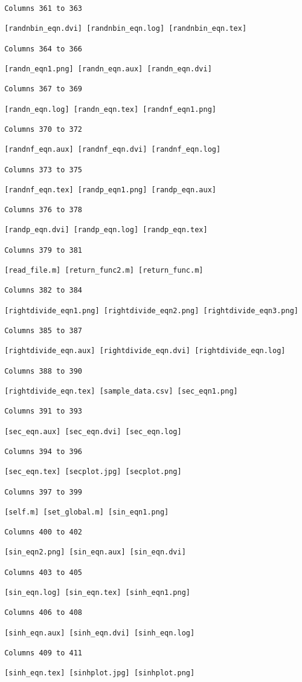 \begin{verbatim}
 Columns 361 to 363

 [randnbin_eqn.dvi] [randnbin_eqn.log] [randnbin_eqn.tex] 

 Columns 364 to 366

 [randn_eqn1.png] [randn_eqn.aux] [randn_eqn.dvi] 

 Columns 367 to 369

 [randn_eqn.log] [randn_eqn.tex] [randnf_eqn1.png] 

 Columns 370 to 372

 [randnf_eqn.aux] [randnf_eqn.dvi] [randnf_eqn.log] 

 Columns 373 to 375

 [randnf_eqn.tex] [randp_eqn1.png] [randp_eqn.aux] 

 Columns 376 to 378

 [randp_eqn.dvi] [randp_eqn.log] [randp_eqn.tex] 

 Columns 379 to 381

 [read_file.m] [return_func2.m] [return_func.m] 

 Columns 382 to 384

 [rightdivide_eqn1.png] [rightdivide_eqn2.png] [rightdivide_eqn3.png] 

 Columns 385 to 387

 [rightdivide_eqn.aux] [rightdivide_eqn.dvi] [rightdivide_eqn.log] 

 Columns 388 to 390

 [rightdivide_eqn.tex] [sample_data.csv] [sec_eqn1.png] 

 Columns 391 to 393

 [sec_eqn.aux] [sec_eqn.dvi] [sec_eqn.log] 

 Columns 394 to 396

 [sec_eqn.tex] [secplot.jpg] [secplot.png] 

 Columns 397 to 399

 [self.m] [set_global.m] [sin_eqn1.png] 

 Columns 400 to 402

 [sin_eqn2.png] [sin_eqn.aux] [sin_eqn.dvi] 

 Columns 403 to 405

 [sin_eqn.log] [sin_eqn.tex] [sinh_eqn1.png] 

 Columns 406 to 408

 [sinh_eqn.aux] [sinh_eqn.dvi] [sinh_eqn.log] 

 Columns 409 to 411

 [sinh_eqn.tex] [sinhplot.jpg] [sinhplot.png] 


\end{verbatim}
